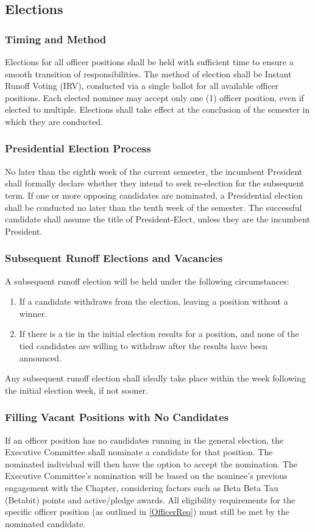 \documentclass[10pt, oneside]{article}
\begin{document}
\subsection{Elections}

\subsubsection{Timing and Method}
Elections for all officer positions shall be held with sufficient time to ensure a smooth transition of responsibilities. The method of election shall be Instant Runoff Voting (IRV), conducted via a single ballot for all available officer positions. Each elected nominee may accept only one (1) officer position, even if elected to multiple. Elections shall take effect at the conclusion of the semester in which they are conducted.

\subsubsection{Presidential Election Process}
No later than the eighth week of the current semester, the incumbent President shall formally declare whether they intend to seek re-election for the subsequent term. If one or more opposing candidates are nominated, a Presidential election shall be conducted no later than the tenth week of the semester. The successful candidate shall assume the title of President-Elect, unless they are the incumbent President.

\subsubsection{Subsequent Runoff Elections and Vacancies}
A subsequent runoff election will be held under the following circumstances:
\begin{enumerate}[label=\alph*.]
    \item If a candidate withdraws from the election, leaving a position without a winner.
    \item If there is a tie in the initial election results for a position, and none of the tied candidates are willing to withdraw after the results have been announced.
\end{enumerate}
Any subsequent runoff election shall ideally take place within the week following the initial election week, if not sooner.

\subsubsection{Filling Vacant Positions with No Candidates}
If an officer position has no candidates running in the general election, the Executive Committee shall nominate a candidate for that position. The nominated individual will then have the option to accept the nomination. The Executive Committee's nomination will be based on the nominee's previous engagement with the Chapter, considering factors such as Beta Beta Tau (Betabit) points and active/pledge awards. All eligibility requirements for the specific officer position (as outlined in \ref{OfficerReq}) must still be met by the nominated candidate.
\end{document}
